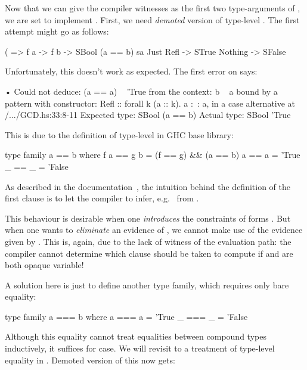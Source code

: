 \documentclass[demotion-paper.tex]{subfiles}
\begin{document}
Now that we can give the compiler witnesses as the first two type-arguments of , we are set to implement .
First, we need \emph{demoted} version of type-level \hask{(==)}.
The first attempt might go as follows:
\begin{code}
(%
      => f a -> f b -> SBool (a == b)
sa %
  Just Refl -> STrue
  Nothing -> SFalse
\end{code}
Unfortunately, this doesn't work as expected.
The first error on  says:

\begin{repl}
• Could not deduce: (a == a) ~ 'True
  from the context: b ~ a
    bound by a pattern with constructor:
               Refl :: forall k (a :: k). a :~: a,
             in a case alternative
    at /.../GCD.hs:33:8-11
  Expected type: SBool (a == b)
    Actual type: SBool 'True
\end{repl}

This is due to the definition of type-level \hask{(==)} in GHC base library:

\begin{code}
type family a == b where
  f a == g b = (f == g) && (a == b)
  a   == a   = 'True
  _   == _   = 'False
\end{code}
As described in the documentation~\cite{GHC-Team:2021aa}, the intuition behind the definition of the first clause is to let the compiler to infer, e.g.\  from .

This behaviour is desirable when one \emph{introduces} the constraints of forms .
But when one wants to \emph{eliminate} an evidence of , we cannot make use of the evidence given by .
This is, again, due to the lack of witness of the evaluation path: the compiler cannot determine which clause should be taken to compute  if  and  are both opaque variable!

A solution here is just to define another type family, which requires only bare equality:
\begin{code}
type family a === b where
  a === a = 'True
  _ === _ = 'False
\end{code}

Although this equality cannot treat equalities between compound types inductively, it suffices for  case.
We will revisit to a treatment of type-level equality in .
Demoted version of this now gets:
\end{document}
